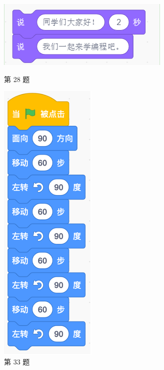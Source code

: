 \documentclass[10pt, a4paper]{article}
\begin{document}
\begin{enumerate}
        \begin{figure}[htbp]
            \begin{minipage}[t]{.24\textwidth}
                \centering
                \includegraphics[width=\textwidth]{28.png}
                \caption*{第 28 题}
            \end{minipage}
            \begin{minipage}[t]{.24\textwidth}
                \centering
                \includegraphics[width=.3\textwidth]{33.png}
                \caption*{第 33 题}
            \end{minipage}
            \begin{minipage}[t]{.24\textwidth}
                \centering
                \begin{minipage}[t]{.38\textwidth}

\end{minipage}
\end{minipage}
\end{figure}
\end{enumerate}
\end{document}
